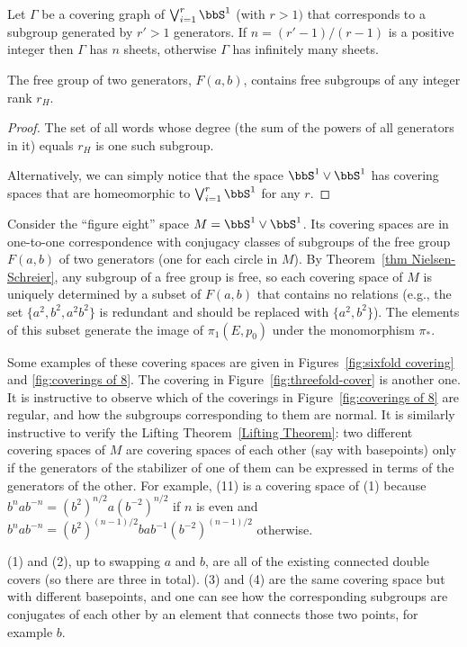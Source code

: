 \begin{cor}
    Let $\Gamma$ be a covering graph of $\bigvee_{i=1}^r \bbS^1$ (with $r>1)$ that corresponds to a subgroup generated by $r'>1$ generators. If $n=(r'-1)/(r-1)$ is a positive integer then $\Gamma$ has $n$ sheets, otherwise $\Gamma$ has infinitely many sheets.
\end{cor}
\begin{cor}
    The free group of two generators, $F(a,b)$, contains free subgroups of any integer rank $r_H$. 
\end{cor}
\begin{proof}
    The set of all words whose degree (the sum of the powers of all generators in it) equals $r_H$ is one such subgroup.

    Alternatively, we can simply notice that the space $\bbS^1\vee \bbS^1$ has covering spaces that are homeomorphic to $\bigvee_{i=1}^r \bbS^1$ for any $r$.
\end{proof}

\begin{example}
    Consider the ``figure eight'' space $M=\bbS^1\vee \bbS^1$. Its covering spaces are in one-to-one correspondence with conjugacy classes of subgroups of the free group $F(a,b)$ of two generators (one for each circle in $M$). By Theorem~\ref{thm Nielsen-Schreier}, any subgroup of a free group is free, so each covering space of $M$ is uniquely determined by a subset of $F(a,b)$ that contains no relations (e.g., the set $\{a^2,b^2,a^2b^2\}$ is redundant and should be replaced with $\{a^2,b^2\}$). The elements of this subset generate the image of $\pi_1(E,p_0)$ under the monomorphism $\pi_\ast$.

    Some examples of these covering spaces are given in Figures~\ref{fig:sixfold covering} and \ref{fig:coverings of 8}. The covering in Figure~\ref{fig:threefold-cover} is another one. It is instructive to observe which of the coverings in Figure~\ref{fig:coverings of 8} are regular, and how the subgroups corresponding to them are normal. It is similarly instructive to verify the Lifting Theorem~\ref{Lifting Theorem}: two different covering spaces of $M$ are covering spaces of each other (say with basepoints) only if the generators of the stabilizer of one of them can be expressed in terms of the generators of the other. For example, (11) is a covering space of (1) because  $b^nab^{-n}=(b^2)^{n/2}a(b^{-2})^{n/2}$ if $n$ is even and $b^nab^{-n}=(b^2)^{(n-1)/2}bab^{-1}(b^{-2})^{(n-1)/2}$ otherwise.

    (1) and (2), up to swapping $a$ and $b$, are all of the existing connected double covers (so there are three in total). (3) and (4) are the same covering space but with different basepoints, and one can see how the corresponding subgroups are conjugates of each other by an element that connects those two points, for example $b$.
\end{example}


